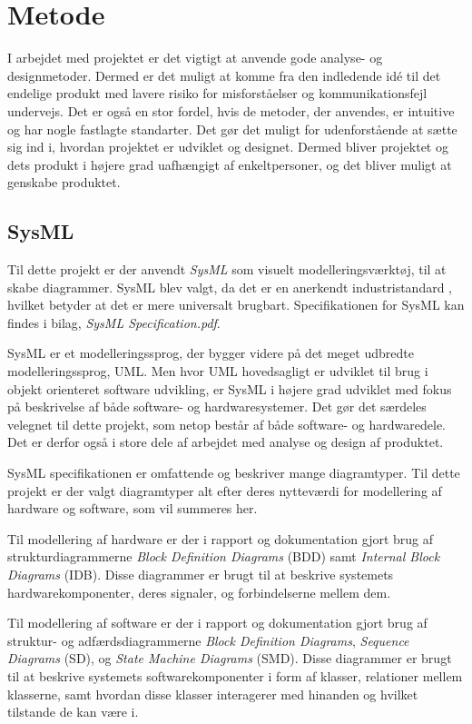 \chapter{Metode}
I arbejdet med projektet er det vigtigt at anvende gode analyse- og designmetoder. Dermed er det muligt at komme fra den indledende idé til det endelige produkt med lavere risiko for misforståelser og kommunikationsfejl undervejs. Det er også en stor fordel, hvis de metoder, der anvendes, er intuitive og har nogle fastlagte standarter. Det gør det muligt for udenforstående at sætte sig ind i, hvordan projektet er udviklet og designet. Dermed bliver projektet og dets produkt i højere grad uafhængigt af enkeltpersoner, og det bliver muligt at genskabe produktet.

\section{SysML}
Til dette projekt er der anvendt \textit{SysML} som visuelt modelleringsværktøj, til at skabe diagrammer. SysML blev valgt, da det er en anerkendt industristandard\cite{website:SysML} , hvilket betyder at det er mere universalt brugbart. Specifikationen for SysML kan findes i bilag, \textit{SysML Specification.pdf}.

SysML er et modelleringssprog, der bygger videre på det meget udbredte modelleringssprog, UML. Men hvor UML hovedsagligt er udviklet til brug i objekt orienteret software udvikling, er SysML i højere grad udviklet med fokus på beskrivelse af både software- og hardwaresystemer. Det gør det særdeles velegnet til dette projekt, som netop består af både software- og hardwaredele. Det er derfor også i store dele af arbejdet med analyse og design af produktet.

SysML specifikationen er omfattende og beskriver mange diagramtyper. Til dette projekt er der valgt diagramtyper alt efter deres nytteværdi for modellering af hardware og software, som vil summeres her.

Til modellering af hardware er der i rapport og dokumentation gjort brug af strukturdiagrammerne \textit{Block Definition Diagrams} (BDD) samt \textit{Internal Block Diagrams} (IDB). Disse diagrammer er brugt til at beskrive systemets hardwarekomponenter, deres signaler, og forbindelserne mellem dem.

Til modellering af software er der i rapport og dokumentation gjort brug af struktur- og adfærdsdiagrammerne \textit{Block Definition Diagrams}, \textit{Sequence Diagrams} (SD), og \textit{State Machine Diagrams} (SMD). Disse diagrammer er brugt til at beskrive systemets softwarekomponenter i form af klasser, relationer mellem klasserne, samt hvordan disse klasser interagerer med hinanden og hvilket tilstande de kan være i.

